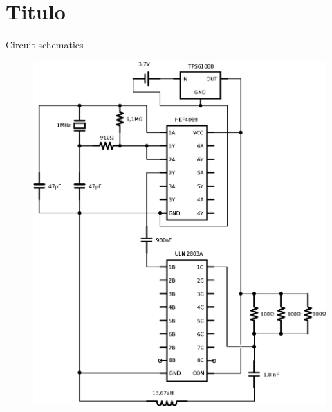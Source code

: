 \chapter{Titulo}

Circuit schematics


\begin{figure}[htb]
\begin{center}
\includegraphics[width=1\textwidth]{./images/circuitv5}
\end{center}
\end{figure}
